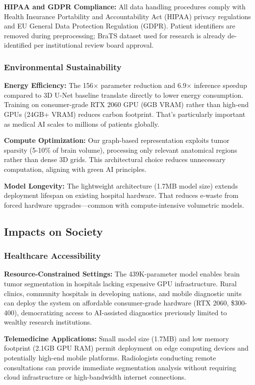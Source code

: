 \textbf{HIPAA and GDPR Compliance:} All data handling procedures comply with Health Insurance Portability and Accountability Act (HIPAA) privacy regulations and EU General Data Protection Regulation (GDPR). Patient identifiers are removed during preprocessing; BraTS dataset used for research is already de-identified per institutional review board approval.

\subsubsection{Environmental Sustainability}

\textbf{Energy Efficiency:} The 156$\times$ parameter reduction and 6.9$\times$ inference speedup compared to 3D U-Net baseline translate directly to lower energy consumption. Training on consumer-grade RTX 2060 GPU (6GB VRAM) rather than high-end GPUs (24GB+ VRAM) reduces carbon footprint. That's particularly important as medical AI scales to millions of patients globally.

\textbf{Compute Optimization:} Our graph-based representation exploits tumor sparsity (5-10\% of brain volume), processing only relevant anatomical regions rather than dense 3D grids. This architectural choice reduces unnecessary computation, aligning with green AI principles.

\textbf{Model Longevity:} The lightweight architecture (1.7MB model size) extends deployment lifespan on existing hospital hardware. That reduces e-waste from forced hardware upgrades—common with compute-intensive volumetric models.


\subsection{Impacts on Society}

\subsubsection{Healthcare Accessibility}

\textbf{Resource-Constrained Settings:} The 439K-parameter model enables brain tumor segmentation in hospitals lacking expensive GPU infrastructure. Rural clinics, community hospitals in developing nations, and mobile diagnostic units can deploy the system on affordable consumer-grade hardware (RTX 2060, \$300-400), democratizing access to AI-assisted diagnostics previously limited to wealthy research institutions.

\textbf{Telemedicine Applications:} Small model size (1.7MB) and low memory footprint (2.1GB GPU RAM) permit deployment on edge computing devices and potentially high-end mobile platforms. Radiologists conducting remote consultations can provide immediate segmentation analysis without requiring cloud infrastructure or high-bandwidth internet connections.


